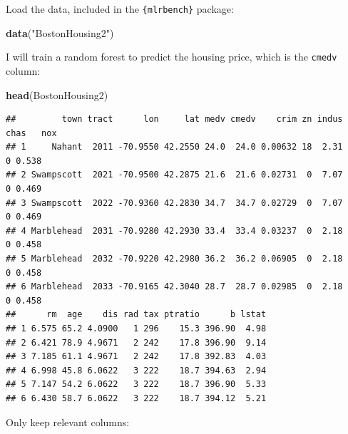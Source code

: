 \documentclass[]{gitbook}
\newenvironment{Shaded}{\begin{snugshade}}{\end{snugshade}}
\newcommand{\DataTypeTok}[1]{\textcolor[rgb]{0.13,0.29,0.53}{#1}}
\newcommand{\KeywordTok}[1]{\textcolor[rgb]{0.13,0.29,0.53}{\textbf{#1}}}
\newcommand{\NormalTok}[1]{#1}
\newcommand{\OperatorTok}[1]{\textcolor[rgb]{0.81,0.36,0.00}{\textbf{#1}}}
\newcommand{\StringTok}[1]{\textcolor[rgb]{0.31,0.60,0.02}{#1}}
\begin{document}
Load the data, included in the \texttt{\{mlrbench\}} package:

\begin{Shaded}
\begin{Highlighting}[]
\KeywordTok{data}\NormalTok{(}\StringTok{"BostonHousing2"}\NormalTok{)}
\end{Highlighting}
\end{Shaded}

I will train a random forest to predict the housing price, which is the \texttt{cmedv} column:

\begin{Shaded}
\begin{Highlighting}[]
\KeywordTok{head}\NormalTok{(BostonHousing2)}
\end{Highlighting}
\end{Shaded}

\begin{verbatim}
##         town tract      lon     lat medv cmedv    crim zn indus chas   nox
## 1     Nahant  2011 -70.9550 42.2550 24.0  24.0 0.00632 18  2.31    0 0.538
## 2 Swampscott  2021 -70.9500 42.2875 21.6  21.6 0.02731  0  7.07    0 0.469
## 3 Swampscott  2022 -70.9360 42.2830 34.7  34.7 0.02729  0  7.07    0 0.469
## 4 Marblehead  2031 -70.9280 42.2930 33.4  33.4 0.03237  0  2.18    0 0.458
## 5 Marblehead  2032 -70.9220 42.2980 36.2  36.2 0.06905  0  2.18    0 0.458
## 6 Marblehead  2033 -70.9165 42.3040 28.7  28.7 0.02985  0  2.18    0 0.458
##      rm  age    dis rad tax ptratio      b lstat
## 1 6.575 65.2 4.0900   1 296    15.3 396.90  4.98
## 2 6.421 78.9 4.9671   2 242    17.8 396.90  9.14
## 3 7.185 61.1 4.9671   2 242    17.8 392.83  4.03
## 4 6.998 45.8 6.0622   3 222    18.7 394.63  2.94
## 5 7.147 54.2 6.0622   3 222    18.7 396.90  5.33
## 6 6.430 58.7 6.0622   3 222    18.7 394.12  5.21
\end{verbatim}

Only keep relevant columns:

\begin{Shaded}
\end{Shaded}
\end{document}
